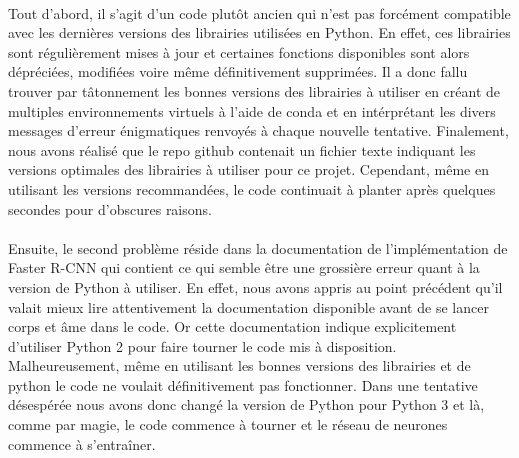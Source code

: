 \paragraph{} Tout d'abord, il s'agit d'un code plutôt ancien qui n'est pas forcément compatible avec les dernières versions des librairies utilisées en Python. En effet, ces librairies sont régulièrement mises à jour et certaines fonctions disponibles sont alors dépréciées, modifiées voire même définitivement supprimées. Il a donc fallu trouver par tâtonnement les bonnes versions des librairies à utiliser en créant de multiples environnements virtuels à l'aide de conda et en intérprétant les divers messages d'erreur énigmatiques renvoyés à chaque nouvelle tentative. Finalement, nous avons réalisé que le repo github contenait un fichier texte indiquant les versions optimales des librairies à utiliser pour ce projet. Cependant, même en utilisant les versions recommandées, le code continuait à planter après quelques secondes pour d'obscures raisons.

\paragraph{} Ensuite, le second problème réside dans la documentation de l'implémentation de Faster R-CNN qui contient ce qui semble être une grossière erreur quant à la version de Python à utiliser. En effet, nous avons appris au point précédent qu'il valait mieux lire attentivement la documentation disponible avant de se lancer corps et âme dans le code. Or cette documentation indique explicitement d'utiliser Python 2 pour faire tourner le code mis à disposition. Malheureusement, même en utilisant les bonnes versions des librairies et de python le code ne voulait définitivement pas fonctionner. Dans une tentative désespérée nous avons donc changé la version de Python pour Python 3 et là, comme par magie, le code commence à tourner et le réseau de neurones commence à s'entraîner.

